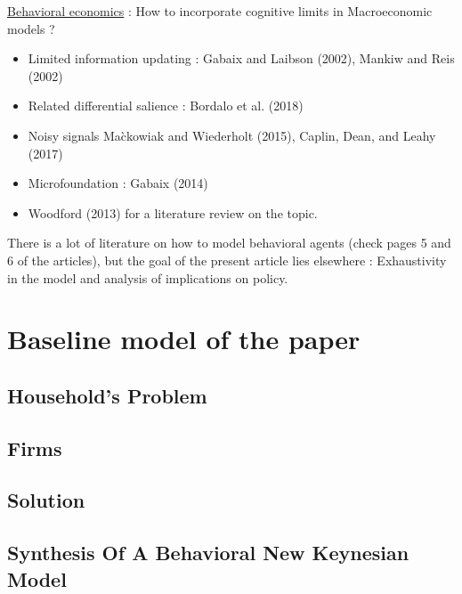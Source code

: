 \documentclass{beamer}
\newcommand\ReduceFont{\fontsize{10}{7.2}\selectfont}
\begin{document}
\begin{frame}{\subsecname}
    \underline{Behavioral economics} : How to incorporate cognitive limits in Macroeconomic models ?
    \begin{itemize}
        \item Limited information updating : Gabaix and Laibson (2002), Mankiw and Reis (2002)
        \item Related differential salience : Bordalo et al. (2018)
        \item Noisy signals Ma\`ckowiak and Wiederholt (2015), Caplin, Dean, and Leahy (2017)
        \item Microfoundation : Gabaix (2014)
        \item Woodford (2013) for a literature review on the topic.
    \end{itemize}
    There is a lot of literature on how to model behavioral agents (check pages 5 and 6 of the articles), but the goal of the present article lies elsewhere : Exhaustivity in the model and analysis of implications on policy.
\end{frame}

\section{Baseline model of the paper}
\begin{frame}
    \ReduceFont
\end{frame}

\begin{frame}
    \tableofcontents[currentsection, hideothersubsections, sections=\value{section}]
\end{frame}

\subsection{Household's Problem}

\subsection{Firms}

\subsection{Solution}

\subsection{Synthesis Of A Behavioral New Keynesian Model}
\end{document}
